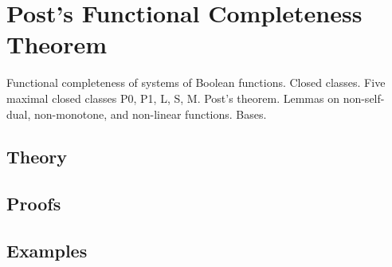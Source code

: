 
\section{Post's Functional Completeness Theorem}
\label{sec:2.3a.02-post-completeness}

\begin{ticket}
Functional completeness of systems of Boolean functions. Closed classes. Five maximal closed classes P0, P1, L, S, M. Post's theorem. Lemmas on non-self-dual, non-monotone, and non-linear functions. Bases.
\end{ticket}

\subsection*{Theory}

\subsection*{Proofs}

\subsection*{Examples}
